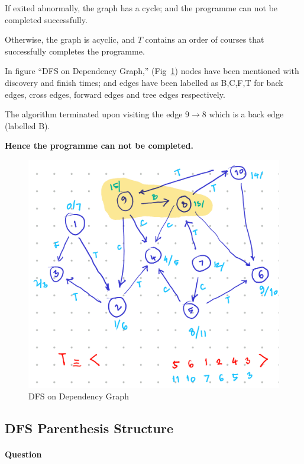 \documentclass[11pt]{article}
\begin{document}
If exited abnormally, the graph has a cycle; and the
programme can not be completed successfully.

Otherwise, the graph is acyclic, and \(T\) contains an
order of courses that successfully completes the
programme.

In figure ``DFS on Dependency Graph,''
(Fig~\ref{fig:dfsOnDependencyGraph}) nodes
have been mentioned with discovery and finish times;
and edges have been labelled as B,C,F,T for back edges,
cross edges, forward edges and tree edges respectively.

The algorithm terminated upon visiting the edge \(9\to
8\) which is a back edge (labelled B).

\textbf{Hence the programme can not be completed.}
\begin{figure}[htbp]
\centering
\includegraphics[width=.9\linewidth]{images/dfsOnDependencyGraph.png}
\caption{\label{fig:dfsOnDependencyGraph}DFS on Dependency Graph}
\end{figure}



\subsection{DFS Parenthesis Structure}
\label{sec:dfs-parenthesis-structure}
\paragraph*{Question}
\label{sec:org96310ef}
\end{document}
